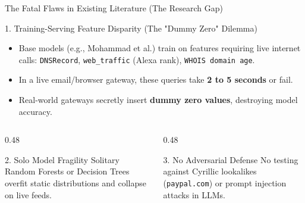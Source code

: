 \documentclass[aspectratio=169,10pt]{beamer}
\begin{document}
\begin{frame}{The Fatal Flaws in Existing Literature (The Research Gap)}
    \begin{block}{1. Training-Serving Feature Disparity (The "Dummy Zero" Dilemma)}
        \begin{itemize}
            \item Base models (e.g., Mohammad et al.) train on features requiring live internet calls: \texttt{DNSRecord}, \texttt{web\_traffic} (Alexa rank), \texttt{WHOIS domain age}.
            \item In a live email/browser gateway, these queries take \textbf{2 to 5 seconds} or fail.
            \item Real-world gateways secretly insert \textbf{dummy zero values}, destroying model accuracy.
        \end{itemize}
    \end{block}

    \begin{columns}[T]
        \begin{column}{0.48\textwidth}
            \begin{alertblock}{2. Solo Model Fragility}
                Solitary Random Forests or Decision Trees overfit static distributions and collapse on live feeds.
            \end{alertblock}
        \end{column}
        \begin{column}{0.48\textwidth}
            \begin{alertblock}{3. No Adversarial Defense}
                No testing against Cyrillic lookalikes (\texttt{paypаl.com}) or prompt injection attacks in LLMs.
            \end{alertblock}
        \end{column}
    \end{columns}
\end{frame}
\end{document}
